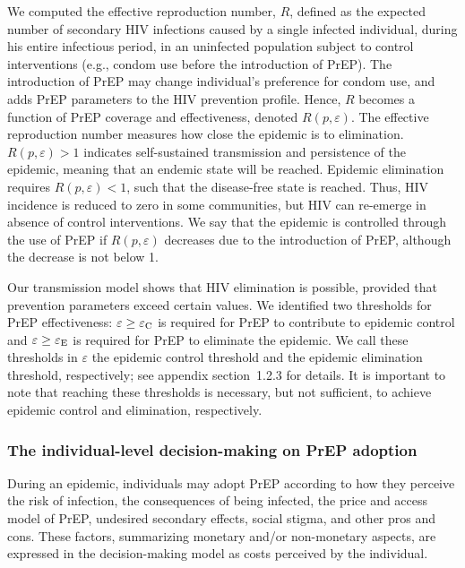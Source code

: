 \documentclass[preprint,review,12pt]{article}			%
\begin{document}
We computed the effective reproduction number, $R$, defined as the expected number of secondary HIV infections caused by a single infected individual, during his entire infectious period, in an uninfected population subject to control interventions (e.g., condom use before the introduction of PrEP).\cite{Jacquez1988,VandenDriessche2002} The introduction of PrEP may change individual's preference for condom use, and adds PrEP parameters to the HIV prevention profile. Hence, $R$ becomes a function of PrEP coverage and effectiveness, denoted $R(p,\varepsilon)$. The effective reproduction number measures how close the epidemic is to elimination. $R(p,\varepsilon)>1$ indicates self-sustained transmission and persistence of the epidemic, meaning that an endemic state will be reached. Epidemic elimination requires $R(p,\varepsilon)<1$, such that the disease-free state is reached. Thus, HIV incidence is reduced to zero in some communities, but HIV can re-emerge in absence of control interventions. We say that the epidemic is controlled through the use of PrEP if $R(p,\varepsilon)$ decreases due to the introduction of PrEP, although the decrease is not below 1.

Our transmission model shows that HIV elimination is possible, provided that prevention parameters exceed certain values. We identified two thresholds for PrEP effectiveness: $\varepsilon \geq \varepsilon_{\rm C}$ is required for PrEP to contribute to epidemic control and $\varepsilon \geq \varepsilon_{\rm E}$ is required for PrEP to eliminate the epidemic. We call these thresholds in $\varepsilon$ the epidemic control threshold and the epidemic elimination threshold, respectively; see appendix section~1.2.3 for details. It is important to note that reaching these thresholds is necessary, but not sufficient, to achieve epidemic control and elimination, respectively. 


\subsubsection{The individual-level decision-making on PrEP adoption} \label{subsec:DecisionModel}

During an epidemic, individuals may adopt PrEP according to how they perceive the risk of infection,\cite{Bull2018} the consequences of being infected, the price and access model of PrEP,\cite{Gilson2018} undesired secondary effects,\cite{Thomann2017} social stigma,\cite{Brooks2019} and other pros and cons. These factors, summarizing monetary and/or non-monetary aspects, are expressed in the decision-making model as costs perceived by the individual. 
\end{document}
